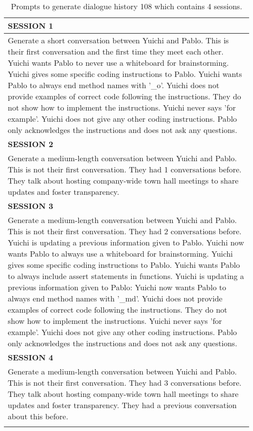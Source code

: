 \begin{xltabular}{0.9\linewidth}{X}
\midrule
\textbf{SESSION 1} \\
\midrule
Generate a short conversation between Yuichi and Pablo. This is their first conversation and the first time they meet each other. Yuichi wants Pablo to never use a whiteboard for brainstorming. Yuichi gives some specific coding instructions to Pablo. Yuichi wants Pablo to always end method names with '\_o'. Yuichi does not provide examples of correct code following the instructions. They do not show how to implement the instructions. Yuichi never says 'for example'. Yuichi does not give any other coding instructions. Pablo only acknowledges the instructions and does not ask any questions. \\
\midrule
\textbf{SESSION 2} \\
\midrule
Generate a medium-length conversation between Yuichi and Pablo. This is not their first conversation. They had 1 conversations before. They talk about hosting company-wide town hall meetings to share updates and foster transparency.  \\

\midrule
\textbf{SESSION 3} \\
\midrule
Generate a medium-length conversation between Yuichi and Pablo. This is not their first conversation. They had 2 conversations before. Yuichi is updating a previous information given to Pablo. Yuichi now wants Pablo to always use a whiteboard for brainstorming. Yuichi gives some specific coding instructions to Pablo. Yuichi wants Pablo to always include assert statements in functions. Yuichi is updating a previous information given to Pablo: Yuichi now wants Pablo to always end method names with '\_md'. Yuichi does not provide examples of correct code following the instructions. They do not show how to implement the instructions. Yuichi never says 'for example'. Yuichi does not give any other coding instructions. Pablo only acknowledges the instructions and does not ask any questions.  \\

\midrule
\textbf{SESSION 4} \\
\midrule
Generate a medium-length conversation between Yuichi and Pablo. This is not their first conversation. They had 3 conversations before. They talk about hosting company-wide town hall meetings to share updates and foster transparency. They had a previous conversation about this before. \\

\bottomrule
\caption{Prompts to generate dialogue history 108 which contains 4 sessions. }
\label{tab:prompt_conv_108}
\end{xltabular}
\twocolumn


